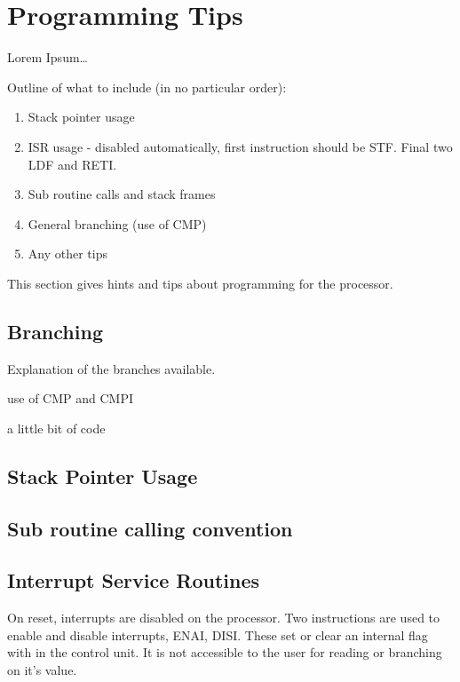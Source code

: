 
\section{Programming Tips}
Lorem Ipsum\dots
{}

Outline of what to include (in no particular order):
\begin{enumerate}
\item Stack pointer usage
\item ISR usage - disabled automatically, first instruction should be STF. Final two LDF and RETI.
\item Sub routine calls and stack frames
\item General branching (use of CMP)
\item Any other tips
\end{enumerate}


This section gives hints and tips about programming for the \samurai{} processor. 

\subsection{Branching}

Explanation of the branches available.

use of CMP and CMPI

a little bit of code


\subsection{Stack Pointer Usage}



\subsection{Sub routine calling convention}


\subsection{Interrupt Service Routines}

On reset, interrupts are disabled on the \samurai{} processor.
Two instructions are used to enable and disable interrupts, ENAI, DISI.
These set or clear an internal flag with in the control unit. 
It is not accessible to the user for reading or branching on it's value.



